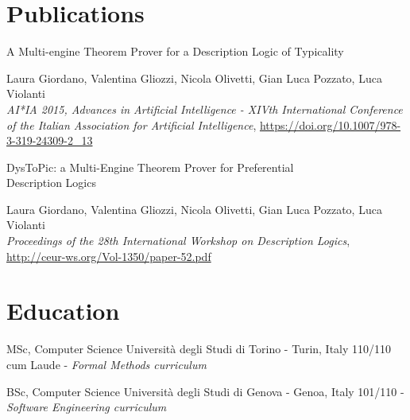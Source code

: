 \documentclass[nocolors]{curriculum-vitae}
\begin{document}
    \vspace*{-0.4cm}

    \section{Publications}
        \vspace*{-0.2cm}
        \begin{entrylist}
             {A Multi-engine Theorem Prover for a Description Logic of Typicality} {}
            {\begin{footnotesize}
                Laura Giordano, Valentina Gliozzi, Nicola Olivetti, Gian Luca Pozzato, Luca Violanti\\
                \emph{AI{*}IA 2015, Advances in Artificial Intelligence - XIVth International Conference of the Italian Association for Artificial Intelligence},
                \url{https://doi.org/10.1007/978-3-319-24309-2\_13}
            \end{footnotesize}}

             {DysToPic: a Multi-Engine Theorem Prover for Preferential\\Description Logics} {}
            {\begin{footnotesize}
                Laura Giordano, Valentina Gliozzi, Nicola Olivetti, Gian Luca Pozzato, Luca Violanti\\
                \emph{Proceedings of the 28th International Workshop on Description Logics},\\
                \url{http://ceur-ws.org/Vol-1350/paper-52.pdf}
            \end{footnotesize}}
        \end{entrylist}

    \vspace*{-0.2cm}

    \section{Education}
        \vspace*{-0.2cm}
        \begin{entrylist}
             {MSc, Computer Science} {Università degli Studi di Torino - Turin, Italy}
            {110/110 cum Laude - \emph{Formal Methods curriculum}}

             {BSc, Computer Science} {Università degli Studi di Genova - Genoa, Italy}
            {101/110 - \emph{Software Engineering curriculum}}
        \end{entrylist}

    \vspace*{-2cm}
\end{document}
